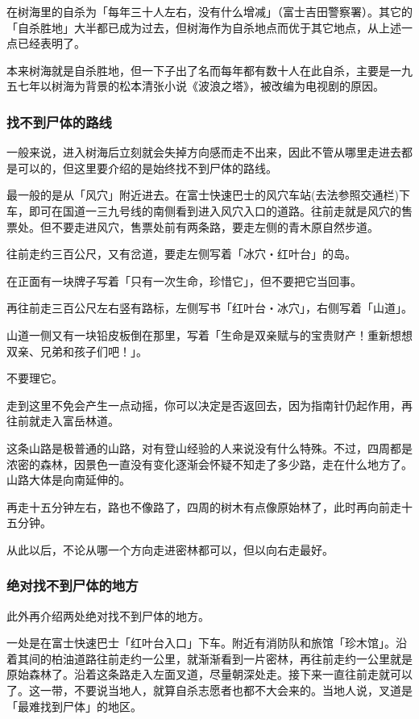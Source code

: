 \documentclass[UTF8]{ctexart}
\begin{document}
在树海里的自杀为「每年三十人左右，没有什么增减」（富士吉田警察署）。其它的「自杀胜地」大半都已成为过去，但树海作为自杀地点而优于其它地点，从上述一点已经表明了。

本来树海就是自杀胜地，但一下子出了名而每年都有数十人在此自杀，主要是一九五七年以树海为背景的松本清张小说《波浪之塔》，被改编为电视剧的原因。

\subsubsection*{找不到尸体的路线}

一般来说，进入树海后立刻就会失掉方向感而走不出来，因此不管从哪里走进去都是可以的，但这里要介绍的是始终找不到尸体的路线。

最一般的是从「风穴」附近进去。在富士快速巴士的风穴车站(去法参照交通栏)下车，即可在国道一三九号线的南侧看到进入风穴入口的道路。往前走就是风穴的售票处。但不要走进风穴，售票处前有两条路，要走左侧的青木原自然步道。

往前走约三百公尺，又有岔道，要走左侧写着「冰穴‧红叶台」的岛。

在正面有一块牌子写着「只有一次生命，珍惜它」，但不要把它当回事。

再往前走三百公尺左右竖有路标，左侧写书「红叶台‧冰穴」，右侧写着「山道」。

山道一侧又有一块铅皮板倒在那里，写着「生命是双亲赋与的宝贵财产！重新想想双亲、兄弟和孩子们吧！」。

不要理它。

走到这里不免会产生一点动摇，你可以决定是否返回去，因为指南针仍起作用，再往前就走入富岳林道。

这条山路是极普通的山路，对有登山经验的人来说没有什么特殊。不过，四周都是浓密的森林，因景色一直没有变化逐渐会怀疑不知走了多少路，走在什么地方了。山路大体是向南延伸的。

再走十五分钟左右，路也不像路了，四周的树木有点像原始林了，此时再向前走十五分钟。

从此以后，不论从哪一个方向走进密林都可以，但以向右走最好。

\subsubsection*{绝对找不到尸体的地方}

此外再介绍两处绝对找不到尸体的地方。

一处是在富士快速巴士「红叶台入口」下车。附近有消防队和旅馆「珍木馆」。沿着其间的柏油道路往前走约一公里，就渐渐看到一片密林，再往前走约一公里就是原始森林了。沿着这条路走入左面叉道，尽量朝深处走。接下来一直往前走就可以了。这一带，不要说当地人，就算自杀志愿者也都不大会来的。当地人说，叉道是「最难找到尸体」的地区。
\end{document}
